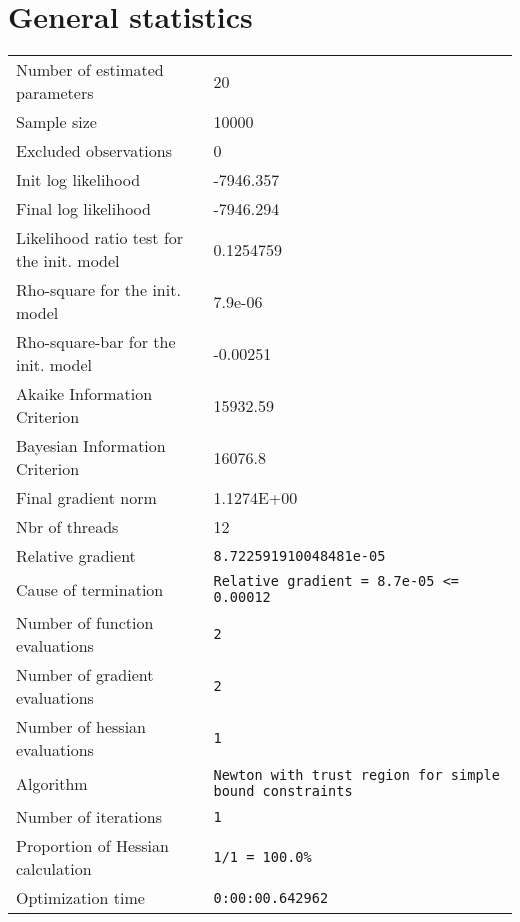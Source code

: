 



\section{General statistics}
\begin{tabular}{ll}
Number of estimated parameters & 20 \\
Sample size & 10000 \\
Excluded observations & 0 \\
Init log likelihood & -7946.357 \\
Final log likelihood & -7946.294 \\
Likelihood ratio test for the init. model & 0.1254759 \\
Rho-square for the init. model & 7.9e-06 \\
Rho-square-bar for the init. model & -0.00251 \\
Akaike Information Criterion & 15932.59 \\
Bayesian Information Criterion & 16076.8 \\
Final gradient norm & 1.1274E+00 \\
Nbr of threads & 12 \\
Relative gradient & \verb$8.722591910048481e-05$ \\
Cause of termination & \verb$Relative gradient = 8.7e-05 <= 0.00012$ \\
Number of function evaluations & \verb$2$ \\
Number of gradient evaluations & \verb$2$ \\
Number of hessian evaluations & \verb$1$ \\
Algorithm & \verb$Newton with trust region for simple bound constraints$ \\
Number of iterations & \verb$1$ \\
Proportion of Hessian calculation & \verb$1/1 = 100.0%$ \\
Optimization time & \verb$0:00:00.642962$ \\
\end{tabular}

